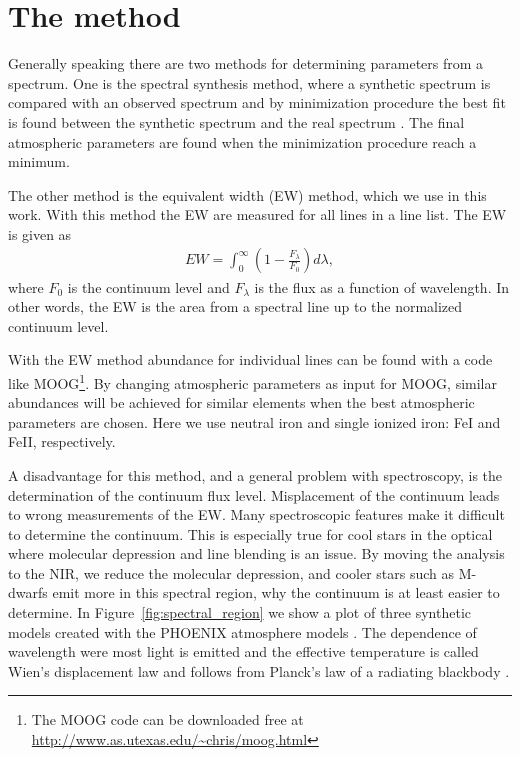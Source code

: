 \documentclass{aa}
\begin{document}
\section{The method}
\label{sec:the_method}

Generally speaking there are two methods for determining parameters from
a spectrum. One is the spectral synthesis method, where a synthetic
spectrum is compared with an observed spectrum and by minimization
procedure the best fit is found between the synthetic spectrum and the
real spectrum \citep[see e.g.][]{Onehag2012}. The final atmospheric
parameters are found when the minimization procedure reach a minimum.

The other method is the equivalent width (EW) method, which we use in this
work.  With this method the EW are measured for all lines in a line list. The
EW is given as
\begin{align}
    \label{eq:EW}
    EW = \int_0^\infty \left(1 - \frac{F_\lambda}{F_0}\right) d\lambda,
\end{align}
where $F_0$ is the continuum level and $F_\lambda$ is the flux as a function
of wavelength. In other words, the EW is the area from a spectral line up
to the normalized continuum level.

With the EW method abundance for individual lines can be found with a code like
MOOG\footnote{The MOOG code can be downloaded free at
\url{http://www.as.utexas.edu/~chris/moog.html}}. By changing atmospheric
parameters as input for MOOG, similar abundances will be achieved for similar
elements when the best atmospheric parameters are chosen. Here we use neutral
iron and single ionized iron: FeI and FeII, respectively.

A disadvantage for this method, and a general problem with spectroscopy,
is the determination of the continuum flux level. Misplacement of the
continuum leads to wrong measurements of the EW. Many spectroscopic
features make it difficult to determine the continuum. This is
especially true for cool stars in the optical where molecular depression
and line blending is an issue. By moving the analysis to the NIR, we
reduce the molecular depression, and cooler stars such as M-dwarfs emit
more in this spectral region, why the continuum is at least easier to
determine. In Figure~\ref{fig:spectral_region} we show a plot of three
synthetic models created with the PHOENIX atmosphere models \citep{Husser2013}.
The dependence of wavelength were most light is emitted and the effective
temperature is called Wien's displacement law and follows from Planck's
law of a radiating blackbody \citep{Gray2006}.
\end{document}
